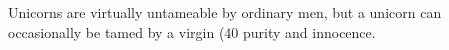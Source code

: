 \begin{multicols}{2}
\begin{description}
\setlength\itemsep{0pt}

\item[Comments] Unicorns are virtually untameable by ordinary men, but a
unicorn can occasionally be tamed by a virgin (40%
purity and innocence.

\end{description}
\end{multicols}
